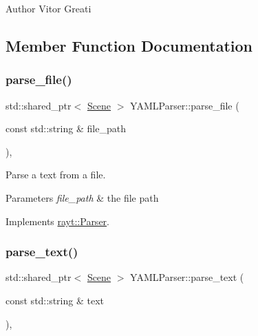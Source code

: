 \begin{DoxyAuthor}{Author}
Vitor Greati 
\end{DoxyAuthor}


\subsection{Member Function Documentation}
\mbox{\label{classrayt_1_1_y_a_m_l_parser_ab569d1029cec7dc2cb91eb0e08f5bc37}} 
\subsubsection{\texorpdfstring{parse\_file()}{parse\_file()}}
{\footnotesize\ttfamily std\+::shared\+\_\+ptr$<$ \mbox{\hyperlink{classrayt_1_1_scene}{Scene}} $>$ Y\+A\+M\+L\+Parser\+::parse\+\_\+file (\begin{DoxyParamCaption}\item[{const std\+::string \&}]{file\+\_\+path }\end{DoxyParamCaption})\hspace{0.3cm}{\ttfamily [override]}, {\ttfamily [virtual]}}



Parse a text from a file. 


\begin{DoxyParams}{Parameters}
{\em file\+\_\+path} & the file path \\
\hline
\end{DoxyParams}


Implements \mbox{\hyperlink{classrayt_1_1_parser_aa8ccda646d36c2c33013535947593def}{rayt\+::\+Parser}}.

\mbox{\label{classrayt_1_1_y_a_m_l_parser_a646b059fb458cbd5b9bc3a29c1f777f4}} 
\subsubsection{\texorpdfstring{parse\_text()}{parse\_text()}}
{\footnotesize\ttfamily std\+::shared\+\_\+ptr$<$ \mbox{\hyperlink{classrayt_1_1_scene}{Scene}} $>$ Y\+A\+M\+L\+Parser\+::parse\+\_\+text (\begin{DoxyParamCaption}\item[{const std\+::string \&}]{text }\end{DoxyParamCaption})\hspace{0.3cm}{\ttfamily [override]}, {\ttfamily [virtual]}}



